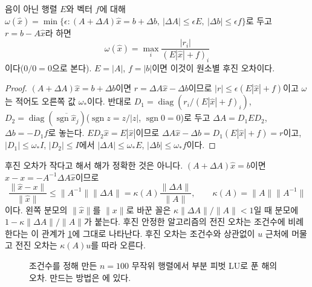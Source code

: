 \begin{theorem}
\label{thm:lu-oettli-prager}
음이 아닌 행렬 $E$와 벡터 $f$에 대해 $\omega(\hat x)=\min\{\epsilon:(A+\Delta A)\hat x=b+\Delta b,\ |\Delta A|\le\epsilon E,\ |\Delta b|\le\epsilon f\}$로 두고 $r=b-A\hat x$라 하면
\[
\omega(\hat x)=\max_i\frac{|r_i|}{(E|\hat x|+f)_i}
\]
이다($0/0=0$으로 본다). $E=|A|$, $f=|b|$이면 이것이 원소별 후진 오차이다.
\end{theorem}

\begin{proof}
$(A+\Delta A)\hat x=b+\Delta b$이면 $r=\Delta A\hat x-\Delta b$이므로 $|r|\le\epsilon(E|\hat x|+f)$이고 $\omega$는 적어도 오른쪽 값 $\omega_\ast$이다. 반대로 $D_1=\operatorname{diag}(r_i/(E|\hat x|+f)_i)$, $D_2=\operatorname{diag}(\overline{\operatorname{sgn}\hat x_j})$($\operatorname{sgn}z=z/|z|$, $\operatorname{sgn}0=0$)로 두고 $\Delta A=D_1ED_2$, $\Delta b=-D_1f$로 놓는다. $ED_2\hat x=E|\hat x|$이므로 $\Delta A\hat x-\Delta b=D_1(E|\hat x|+f)=r$이고, $|D_1|\le\omega_\ast I$, $|D_2|\le I$에서 $|\Delta A|\le\omega_\ast E$, $|\Delta b|\le\omega_\ast f$이다.
\end{proof}

후진 오차가 작다고 해서 해가 정확한 것은 아니다. $(A+\Delta A)\hat x=b$이면 $\hat x-x=-A^{-1}\Delta A\hat x$이므로
\[
\frac{\|\hat x-x\|}{\|\hat x\|}\le\|A^{-1}\|\|\Delta A\|=\kappa(A)\frac{\|\Delta A\|}{\|A\|},\qquad\kappa(A)=\|A\|\|A^{-1}\|
\]
이다. 왼쪽 분모의 $\|\hat x\|$를 $\|x\|$로 바꾼 꼴은 $\kappa\|\Delta A\|/\|A\|<1$일 때 분모에 $1-\kappa\|\Delta A\|/\|A\|$가 붙는다. 후진 안정한 알고리즘의 전진 오차는 조건수에 비례한다는 이 관계가 \cref{fig:lu-forward}에 그대로 나타난다. 후진 오차는 조건수와 상관없이 $u$ 근처에 머물고 전진 오차는 $\kappa(A)u$를 따라 오른다.

\begin{figure}[t]
\centering
{}
\caption{조건수를 정해 만든 $n=100$ 무작위 행렬에서 부분 피벗 LU로 푼 해의 오차. 만드는 방법은 에 있다.}
\label{fig:lu-forward}
\end{figure}

